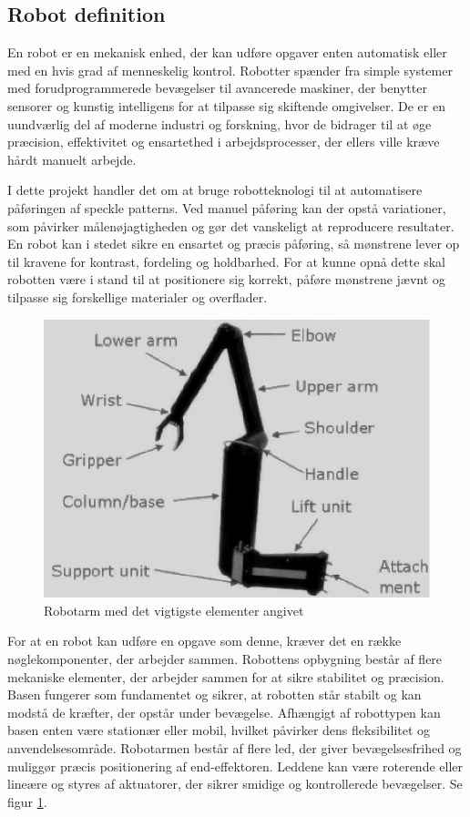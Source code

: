 \subsection{Robot definition} 
En robot er en mekanisk enhed, der kan udføre opgaver enten automatisk eller med en hvis grad af menneskelig kontrol. Robotter spænder fra simple systemer med forudprogrammerede bevægelser til avancerede maskiner, der benytter sensorer og kunstig intelligens for at tilpasse sig skiftende omgivelser. De er en uundværlig del af moderne industri og forskning, hvor de bidrager til at øge præcision, effektivitet og ensartethed i arbejdsprocesser, der ellers ville kræve hårdt manuelt arbejde. 

I dette projekt handler det om at bruge robotteknologi til at automatisere påføringen af speckle patterns. Ved manuel påføring kan der opstå variationer, som påvirker målenøjagtigheden og gør det vanskeligt at reproducere resultater. En robot kan i stedet sikre en ensartet og præcis påføring, så mønstrene lever op til kravene for kontrast, fordeling og holdbarhed. For at kunne opnå dette skal robotten være i stand til at positionere sig korrekt, påføre mønstrene jævnt og tilpasse sig forskellige materialer og overflader.

\begin{figure} [H]
    \centering
    \includegraphics[width=0.7\linewidth]{Sections/2 Problemanalyse/Media/A-robotic-arm-with-labels-1.png}
    \caption{Robotarm med det vigtigste elementer angivet \parencite{ResearchGateALabels}}
    \label{fig:robotarm-navn}
\end{figure}

For at en robot kan udføre en opgave som denne, kræver det en række nøglekomponenter, der arbejder sammen. Robottens opbygning består af flere mekaniske elementer, der arbejder sammen for at sikre stabilitet og præcision. Basen fungerer som fundamentet og sikrer, at robotten står stabilt og kan modstå de kræfter, der opstår under bevægelse. Afhængigt af robottypen kan basen enten være stationær eller mobil, hvilket påvirker dens fleksibilitet og anvendelsesområde. Robotarmen består af flere led, der giver bevægelsesfrihed og muliggør præcis positionering af end-effektoren. Leddene kan være roterende eller lineære og styres af aktuatorer, der sikrer smidige og kontrollerede bevægelser. Se figur \ref{fig:robotarm-navn}.

